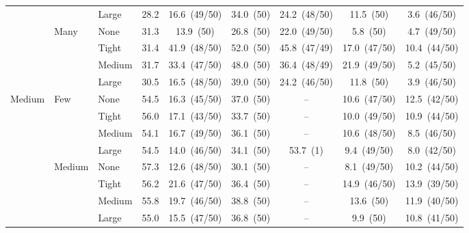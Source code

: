 \begin{table}[htbp]
\begin{tabular}{lll c ccccc}
 &  & {\small Large} & 28.2 & 16.6~{\scriptsize(49/50)} & 34.0~{\scriptsize(50)} & 24.2~{\scriptsize(48/50)} & 11.5~{\scriptsize(50)} & 3.6~{\scriptsize(46/50)} \\
 & \multirow{4}{*}{\small Many} & {\small None} & 31.3 & 13.9~{\scriptsize(50)} & 26.8~{\scriptsize(50)} & 22.0~{\scriptsize(49/50)} & 5.8~{\scriptsize(50)} & 4.7~{\scriptsize(49/50)} \\
 &  & {\small Tight} & 31.4 & 41.9~{\scriptsize(48/50)} & 52.0~{\scriptsize(50)} & 45.8~{\scriptsize(47/49)} & 17.0~{\scriptsize(47/50)} & 10.4~{\scriptsize(44/50)} \\
 &  & {\small Medium} & 31.7 & 33.4~{\scriptsize(47/50)} & 48.0~{\scriptsize(50)} & 36.4~{\scriptsize(48/49)} & 21.9~{\scriptsize(49/50)} & 5.2~{\scriptsize(45/50)} \\
 &  & {\small Large} & 30.5 & 16.5~{\scriptsize(48/50)} & 39.0~{\scriptsize(50)} & 24.2~{\scriptsize(46/50)} & 11.8~{\scriptsize(50)} & 3.9~{\scriptsize(46/50)} \\
\midrule
\multirow{12}{*}{\small Medium} & \multirow{4}{*}{\small Few} & {\small None} & 54.5 & 16.3~{\scriptsize(45/50)} & 37.0~{\scriptsize(50)} & -- & 10.6~{\scriptsize(47/50)} & 12.5~{\scriptsize(42/50)} \\
 &  & {\small Tight} & 56.0 & 17.1~{\scriptsize(43/50)} & 33.7~{\scriptsize(50)} & -- & 10.0~{\scriptsize(49/50)} & 10.9~{\scriptsize(44/50)} \\
 &  & {\small Medium} & 54.1 & 16.7~{\scriptsize(49/50)} & 36.1~{\scriptsize(50)} & -- & 10.6~{\scriptsize(48/50)} & 8.5~{\scriptsize(46/50)} \\
 &  & {\small Large} & 54.5 & 14.0~{\scriptsize(46/50)} & 34.1~{\scriptsize(50)} & 53.7~{\scriptsize(1)} & 9.4~{\scriptsize(49/50)} & 8.0~{\scriptsize(42/50)} \\
 & \multirow{4}{*}{\small Medium} & {\small None} & 57.3 & 12.6~{\scriptsize(48/50)} & 30.1~{\scriptsize(50)} & -- & 8.1~{\scriptsize(49/50)} & 10.2~{\scriptsize(44/50)} \\
 &  & {\small Tight} & 56.2 & 21.6~{\scriptsize(47/50)} & 36.4~{\scriptsize(50)} & -- & 14.9~{\scriptsize(46/50)} & 13.9~{\scriptsize(39/50)} \\
 &  & {\small Medium} & 55.8 & 19.7~{\scriptsize(46/50)} & 38.8~{\scriptsize(50)} & -- & 13.6~{\scriptsize(50)} & 11.9~{\scriptsize(40/50)} \\
 &  & {\small Large} & 55.0 & 15.5~{\scriptsize(47/50)} & 36.8~{\scriptsize(50)} & -- & 9.9~{\scriptsize(50)} & 10.8~{\scriptsize(41/50)} \\

\end{tabular}
\end{table}
